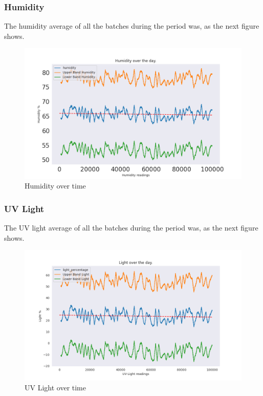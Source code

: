 \documentclass[daily]{engenius}
\begin{document}
\vspace{5mm}
\subsubsection{Humidity}

The humidity average of all the batches during the period was, as the next figure shows.

\begin{figure}[H]
    \begin{center}
        \includegraphics[width=\textwidth/2]{./temp/humidity_plot.png}
        \caption{Humidity over time}
    \end{center}
\end{figure}


\subsubsection{UV Light}

The UV light average of all the batches during the period was, as the next figure shows.

\begin{figure}[H]
    \begin{center}
        \includegraphics[width=\textwidth/2]{./temp/light_plot.png}
        \caption{UV Light over time}
    \end{center}
\end{figure}
\end{document}

